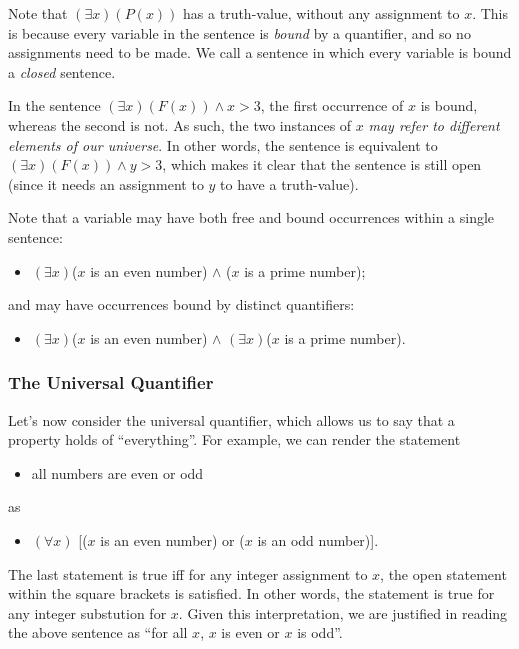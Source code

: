 Note that $(\exists x)(P(x))$ has a truth-value, without any assignment to $x$. This is because every variable in the sentence is \emph{bound} by a quantifier, and so no assignments need to be made. 
We call a sentence in which every variable is bound a \emph{closed} sentence. 

\begin{aside}
    In the sentence $(\exists x)(F(x)) \land x > 3$, the first occurrence of $x$ is bound, whereas the second is not. As such, the two instances of $x$ \emph{may refer to different elements of our universe}. In other words, the sentence is equivalent to $(\exists x)(F(x)) \land y > 3$, which makes it clear that the sentence is still open (since it needs an assignment to $y$ to have a truth-value). 
\end{aside}

Note that a variable may have both free and bound occurrences within a single sentence:
\begin{itemize}
\item $(\exists x)$($x$ is an even number) $\wedge$ ($x$ is a prime number); \end{itemize}
and may have occurrences bound by distinct quantifiers: 
\begin{itemize}
\item $(\exists x)$($x$ is an even number) $\wedge$ $(\exists x)$($x$ is a prime number).
\end{itemize} 


\subsubsection*{The Universal Quantifier}
Let's now consider the universal quantifier, which allows us to say that a property holds of ``everything''. For example, we can render the statement
\begin{itemize}
\item all numbers are even or odd
\end{itemize}
as
\begin{itemize}
\item $(\forall x)$ [($x$ is an even number) or ($x$ is an odd number)].
\end{itemize}
The last statement is true iff for any integer assignment to $x$, the open statement within the square brackets is satisfied. In other words, the statement is true for any integer substution for $x$. Given this interpretation, we are justified in reading the above sentence as ``for all $x$, $x$ is even or $x$ is odd''. 

